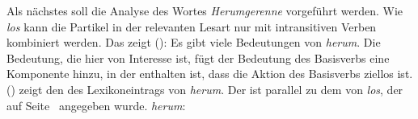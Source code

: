 Als nächstes soll die Analyse des Wortes \emph{Herumgerenne} vorgeführt werden.
Wie \emph{los} kann die Partikel  in der relevanten Lesart nur mit intransitiven Verben kombiniert werden.
Das zeigt ():
\eal
{}
\zl
Es gibt viele Bedeutungen von \emph{herum}. Die Bedeutung,
die hier von Interesse ist, fügt der Bedeutung des Basisverbs
eine Komponente hinzu, in der enthalten ist, dass die Aktion
des Basisverbs ziellos ist.
() zeigt den \locw des Lexikoneintrags von \emph{herum}.
Der \locw ist parallel zu dem von \emph{los}, der auf Seite~\pageref{le-los-asp}
angegeben wurde.
%
\eas
\label{le-herum-part}
\mbox{\emph{herum}:}\\
\zs

